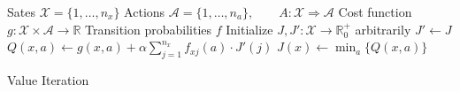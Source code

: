 \documentclass{article}
\begin{document}
\begin{preview}
    \begin{algorithm}[H]
        \begin{algorithmic}
        \Require
        \Statex Sates $\mathcal{X} = \{1, \dots, n_x\}$
        \Statex Actions $\mathcal{A} = \{1, \dots, n_a\},\qquad A: \mathcal{X} \Rightarrow \mathcal{A}$
        \Statex Cost function $g: \mathcal{X} \times \mathcal{A} \rightarrow \mathbb{R}$
        \Statex Transition probabilities $f$
            \State Initialize $J, J': \mathcal{X} \rightarrow \mathbb{R}_0^+$ arbitrarily
                \State $J' \gets J$
                        \State $Q(x, a) \gets g(x, a) + \alpha \sum_{j=1}^{n_x} f_{xj}(a) \cdot J'(j)$
                    \EndFor
                \EndFor
                    \State $J(x) \gets \min_a \{Q(x, a)\}$
                \EndFor
            \EndWhile
        \EndProcedure
        \end{algorithmic}
    \caption{Value Iteration}
    \label{alg:value-iteration}
    \end{algorithm}
\end{preview}
\end{document}
